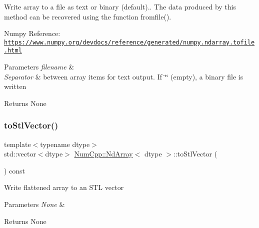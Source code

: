 Write array to a file as text or binary (default).. The data produced by this method can be recovered using the function fromfile().

Numpy Reference\+: \href{https://www.numpy.org/devdocs/reference/generated/numpy.ndarray.tofile.html}{\tt https\+://www.\+numpy.\+org/devdocs/reference/generated/numpy.\+ndarray.\+tofile.\+html}


\begin{DoxyParams}{Parameters}
{\em filename} & \\
\hline
{\em Separator} & between array items for text output. If \char`\"{}\char`\"{} (empty), a binary file is written \\
\hline
\end{DoxyParams}
\begin{DoxyReturn}{Returns}
None 
\end{DoxyReturn}
\mbox{\label{class_num_cpp_1_1_nd_array_afefe67a36969049996d3c8743a61ef36}} 
\subsubsection{\texorpdfstring{to\+Stl\+Vector()}{toStlVector()}}
{\footnotesize\ttfamily template$<$typename dtype$>$ \\
std\+::vector$<$dtype$>$ \mbox{\hyperlink{class_num_cpp_1_1_nd_array}{Num\+Cpp\+::\+Nd\+Array}}$<$ dtype $>$\+::to\+Stl\+Vector (\begin{DoxyParamCaption}{ }\end{DoxyParamCaption}) const\hspace{0.3cm}{\ttfamily [inline]}}

Write flattened array to an S\+TL vector


\begin{DoxyParams}{Parameters}
{\em None} & \\
\hline
\end{DoxyParams}
\begin{DoxyReturn}{Returns}
None 
\end{DoxyReturn}
\mbox{\label{class_num_cpp_1_1_nd_array_a8299e1130a115fbf21568ed9ca9bce5b}} 
